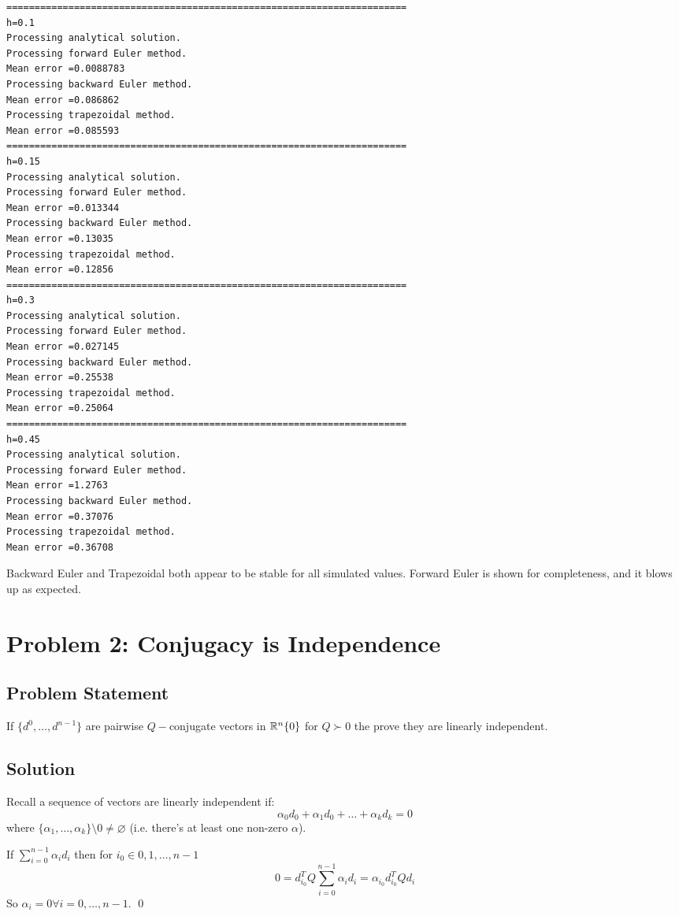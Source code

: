 \documentclass[11pt]{report}
\theoremstyle{definition}
\begin{document}
\newpage
\begin{lstlisting}[basicstyle=\small]
=======================================================================
h=0.1
Processing analytical solution.
Processing forward Euler method.
Mean error =0.0088783
Processing backward Euler method.
Mean error =0.086862
Processing trapezoidal method.
Mean error =0.085593
=======================================================================
h=0.15
Processing analytical solution.
Processing forward Euler method.
Mean error =0.013344
Processing backward Euler method.
Mean error =0.13035
Processing trapezoidal method.
Mean error =0.12856
=======================================================================
h=0.3
Processing analytical solution.
Processing forward Euler method.
Mean error =0.027145
Processing backward Euler method.
Mean error =0.25538
Processing trapezoidal method.
Mean error =0.25064
=======================================================================
h=0.45
Processing analytical solution.
Processing forward Euler method.
Mean error =1.2763
Processing backward Euler method.
Mean error =0.37076
Processing trapezoidal method.
Mean error =0.36708
\end{lstlisting}

Backward Euler and Trapezoidal both appear to be stable for all simulated
values. Forward Euler is shown for completeness, and it blows up as expected.


\newpage
\section*{Problem 2: Conjugacy is Independence}
\subsection*{Problem Statement}
If $\{d^0,\ldots,d^{n-1}\}$ are pairwise $Q-$conjugate vectors in $\mathbb{R}^n\\\{0\}$
for $Q\succ0$ the prove they are linearly independent.

\subsection*{Solution}
Recall a sequence of vectors are linearly independent if:
\[\alpha_0d_0+\alpha_1d_0+\ldots+\alpha_kd_k=0\]
where $\{\alpha_1,\ldots,\alpha_k\} \setminus 0 \neq \varnothing $ (i.e. there's at least one non-zero $\alpha$).

If $\sum_{i=0}^{n-1}\alpha_i d_i$ then for $i_0\in{0,1,\ldots,n-1}$
\[ 0 = d^T_{i_0}Q\sum_{i=0}^{n-1}\alpha_i d_i = \alpha_{i_0}d_{i_0}^TQd_i \]
So $\alpha_i=0\forall i=0,\ldots,n-1$.
\qed
\end{document}

